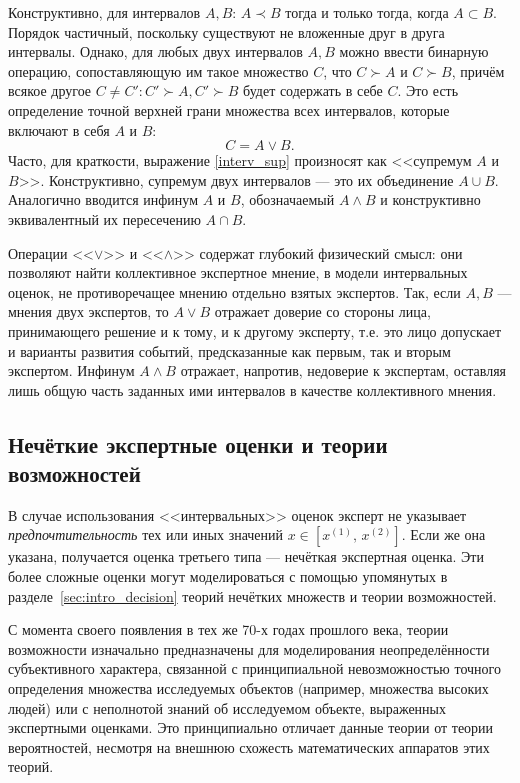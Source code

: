 Конструктивно, для интервалов $A, B$:  $A \prec B$ тогда и только тогда, когда $A \subset B$. Порядок частичный, поскольку существуют не вложенные друг в друга интервалы. Однако, для любых двух интервалов $A, B$ можно ввести бинарную операцию, сопоставляющую им такое множество $C$, что $C \succ A$ и $C \succ B$, причём всякое другое $C \neq C': C' \succ A, C' \succ B$ будет содержать в себе $C$. Это есть определение точной верхней грани множества всех интервалов, которые включают в себя $A$ и $B$:
\begin{equation}
\label{interv_sup}
 C = A \vee B.
\end{equation}
Часто, для краткости, выражение \eqref{interv_sup} произносят как <<супремум  $A$ и $B$>>. Конструктивно, супремум двух интервалов --- это их объединение $A \cup B$. Аналогично вводится инфинум $A$ и $B$, обозначаемый $A \wedge B$ и конструктивно эквивалентный их пересечению $A \cap B$.

Операции <<$\vee$>> и <<$\wedge$>> содержат глубокий физический смысл: они позволяют найти коллективное экспертное мнение, в модели интервальных оценок, не противоречащее мнению отдельно взятых экспертов. Так, если $A, B$ --- мнения двух экспертов, то $A \vee B$ отражает доверие со стороны лица, принимающего решение и к тому, и к другому эксперту, т.е. это лицо допускает и варианты развития событий, предсказанные как первым, так и вторым экспертом. Инфинум  $A \wedge B$ отражает, напротив, недоверие к экспертам, оставляя лишь общую часть заданных ими интервалов в качестве коллективного мнения.

\subsection{Нечёткие экспертные оценки и теории возможностей}

В случае использования <<интервальных>> оценок эксперт не указывает {\sl предпочтительность} тех или иных значений $x \in [x^{(1)},\, x^{(2)}]$. Если же она указана, получается оценка третьего типа --- нечёткая экспертная оценка. Эти более сложные оценки могут моделироваться с помощью упомянутых в разделе~\ref{sec:intro_decision} теорий нечётких множеств и теории возможностей.

С момента своего появления в тех же 70-х годах прошлого века, теории возможности изначально предназначены для моделирования неопределённости субъективного характера, связанной с принципиальной невозможностью точного определения множества исследуемых объектов (например, множества высоких людей) или с неполнотой знаний об исследуемом объекте, выраженных экспертными оценками. Это принципиально отличает данные теории от теории вероятностей, несмотря на внешнюю схожесть математических аппаратов этих теорий. 

